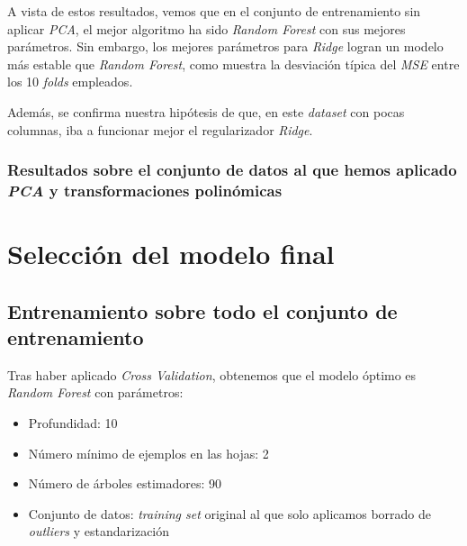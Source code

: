 \documentclass[11pt]{article}
\begin{document}
\begin{table}[H]
  \centering
  \caption{Mejores resultados}
\end{table}

A vista de estos resultados, vemos que en el conjunto de entrenamiento sin aplicar \emph{PCA}, el mejor algoritmo ha sido \emph{Random Forest} con sus mejores parámetros. Sin embargo, los mejores parámetros para \emph{Ridge} logran un modelo más estable que \emph{Random Forest}, como muestra la desviación típica del \emph{MSE} entre los 10 \emph{folds} empleados.

Además, se confirma nuestra hipótesis de que, en este \emph{dataset} con pocas columnas, iba a funcionar mejor el regularizador \emph{Ridge}.

\subsubsection{Resultados sobre el conjunto de datos al que hemos aplicado \emph{PCA} y transformaciones polinómicas}


\pagebreak

\section{Selección del modelo final}

\subsection{Entrenamiento sobre todo el conjunto de entrenamiento}

Tras haber aplicado \emph{Cross Validation}, obtenemos que el modelo óptimo es \emph{Random Forest} con parámetros:

\begin{itemize}
  \item Profundidad: 10
  \item Número mínimo de ejemplos en las hojas: 2
  \item Número de árboles estimadores: 90
  \item Conjunto de datos: \emph{training set} original al que solo aplicamos borrado de \emph{outliers} y  estandarización
\end{itemize}
\end{document}
